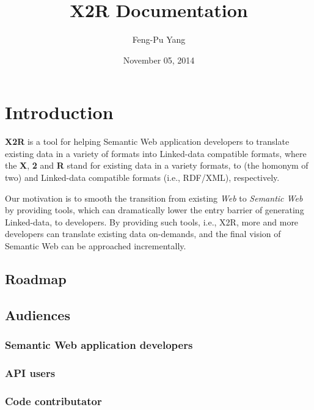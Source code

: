 \documentclass[letterpaper,10pt,english]{sphinxmanual}
\title{X2R Documentation}
\date{November 05, 2014}
\author{Feng-Pu Yang}
\begin{document}
\maketitle
\tableofcontents
{}\label{index::doc}



\chapter{Introduction}
\label{index:introduction}\label{index:welcome-to-x2r-document}
\textbf{X2R} is a tool for helping Semantic Web application developers to translate existing data in a variety of formats into Linked-data compatible formats, where the \textbf{X}, \textbf{2} and \textbf{R} stand for existing data in a variety formats, to (the homonym of two) and Linked-data compatible formats (i.e., RDF/XML), respectively.

Our motivation is to smooth the transition from existing \emph{Web} to \emph{Semantic Web} by providing tools, which can dramatically lower the entry barrier of generating Linked-data, to developers. By providing such tools, i.e., X2R, more and more developers can translate existing data on-demands, and the final vision of Semantic Web can be approached incrementally.


\section{Roadmap}
\label{docs/roadmap::doc}\label{docs/roadmap:roadmap}

\section{Audiences}
\label{docs/audience:audiences}\label{docs/audience::doc}

\subsection{Semantic Web application developers}
\label{docs/audience:semantic-web-application-developers}

\subsection{API users}
\label{docs/audience:api-users}

\subsection{Code contributator}
\label{docs/audience:code-contributator}
\end{document}
